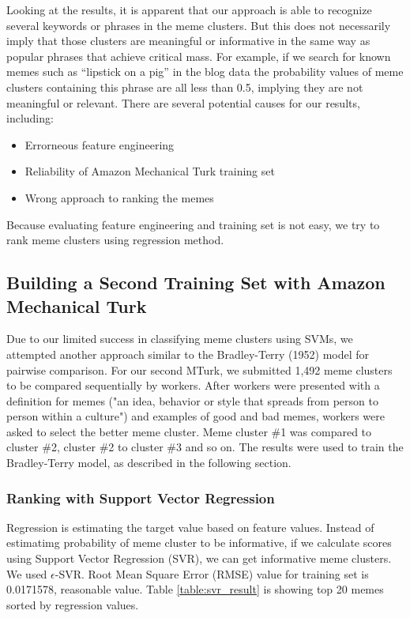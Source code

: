 \documentclass{sig-alternate}
\begin{document}
Looking at the results, it is apparent that our approach is able to recognize several keywords or phrases in the meme clusters.  But this does not necessarily imply that those clusters are meaningful or informative in the same way as popular phrases that achieve critical mass. For example, if  we search for known memes such as  “lipstick on a pig” in the blog data the probability values of meme clusters containing this phrase are all less than 0.5, implying they are not meaningful or relevant. There are several potential causes for our results, including:
\begin{itemize}
 \item Errorneous feature engineering
 \item Reliability of Amazon Mechanical Turk training set
 \item Wrong approach to ranking the memes
\end{itemize}

Because evaluating feature engineering and training set is not easy, we try to rank meme clusters using regression method.

\subsection{Building a Second Training Set with Amazon Mechanical Turk}
Due to our limited success in classifying meme clusters using SVMs, we attempted another approach similar to the Bradley-Terry (1952) model for pairwise comparison.  For our second MTurk, we submitted 1,492 meme clusters to be compared sequentially by workers. After workers were presented with a definition for memes ("an idea, behavior or style that spreads from person to person within a culture") and examples of good and bad memes, workers were asked to select the better meme cluster. Meme cluster \#1 was compared to cluster \#2, cluster \#2 to cluster \#3 and so on.  The results were used to train the Bradley-Terry model, as described in the following section. 

\subsubsection{Ranking with Support Vector Regression}
Regression is estimating the target value based on feature values. Instead of estimatimg probability of meme cluster to be informative, if we calculate scores using Support Vector Regression (SVR), we can get informative meme clusters. We used $\epsilon$-SVR. Root Mean Square Error (RMSE) value for training set is 0.0171578, reasonable value. Table \ref{table:svr_result} is showing top 20 memes sorted by regression values.
\end{document}
